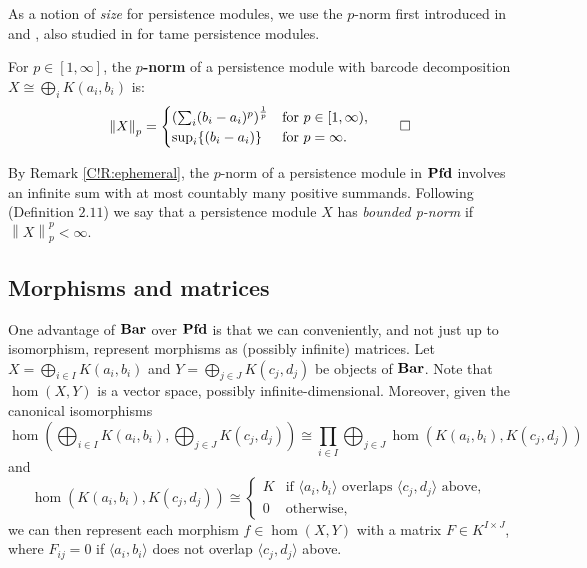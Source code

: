 As a notion of \emph{size} for persistence modules, we use the $p$-norm first introduced in \cite{p-norm_Edesbrunner} and \cite{SkrabaTurner2023}, also studied in \cite{AGRS2025} for tame persistence modules.  

\begin{definition}
\label{C!def:p-norm}
  For $p\in [1,\infty]$, the \textbf{$p$-norm} of a persistence module with barcode decomposition $X\cong \bigoplus_{i} K(a_i, b_i)$ is:
  \begin{equation*}
    \left\| X\right\|_{p} =  \begin{cases}
      \left( \sum_{i} (b_i-a_i)^{p} \right)^{\frac{1}{p}} &\text{for $p\in [1,\infty)$},\\
      \sup_i \{ (b_i-a_i) \} &\text{for $p=\infty$} .
    \end{cases}
    \qedhere
  \end{equation*}
\end{definition}

By Remark \ref{C!R:ephemeral}, the $p$-norm of a persistence module in $\Pfd$ involves an infinite sum with at most countably many positive summands. Following \cite{SkrabaTurner2023} (Definition $2.11$) we say that a persistence module $X$ has \emph{bounded p-norm} if $\left\| X\right\|_{p}^p<\infty$.

\subsection{Morphisms and matrices}
\label{C!sec:mor-mtrx}

One advantage of $\Bar$ over $\Pfd$ is that we can conveniently, and not just up to isomorphism, represent morphisms as (possibly infinite) matrices. Let $X = \bigoplus_{i \in I} K(a_i, b_i)$ and $Y = \bigoplus_{j \in J} K(c_j, d_j)$ be objects of $\Bar$. Note that $\hom(X, Y)$ is a vector space, possibly infinite-dimensional. Moreover, given the canonical isomorphisms
\begin{equation}
\label{C!E:iso1}
  \hom (\bigoplus_{i \in I} K(a_i, b_i), \bigoplus_{j \in J} K(c_j, d_j)) \cong \prod_{i \in I} \bigoplus_{j \in J}  \hom (K(a_i, b_i), K(c_j, d_j))
\end{equation}
and
\begin{equation}
\label{C!E:iso2}
  \hom ( K(a_i, b_i),  K(c_j, d_j)) \cong 
  \begin{cases}
    K & \text{if } \langle a_i, b_i \rangle \text{ overlaps } \langle c_j, d_j \rangle \text{ above}, \\
    0 & \text{otherwise},
  \end{cases}
\end{equation}
we can then represent each morphism $f \in \hom(X, Y)$ with a matrix $F \in K^{I \times J}$, where $F_{ij} = 0$ if $\langle a_i, b_i \rangle$ does not overlap $\langle c_j, d_j \rangle$ above.

